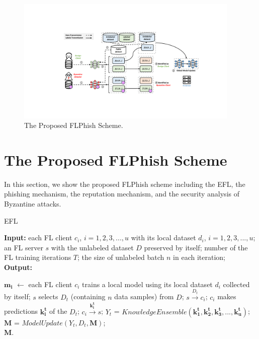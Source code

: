 \documentclass[journal]{IEEEtran}
\begin{document}
\begin{figure}
  \centering
\includegraphics[width=0.95\textwidth]{figures/Figure_FLPhish.pdf}
\caption{The Proposed FLPhish Scheme.}
\label{fig_Phishing}
\end{figure}   


\section{The Proposed FLPhish Scheme}
In this section, we show the proposed FLPhish scheme including the EFL, the phishing mechanism, the reputation mechanism, and the security analysis of Byzantine attacks.

\begin{algorithm}[t]
\caption{EFL} %
\label{alg:system}
\hspace*{0.02in} {\bf Input:} %
each FL client $c_i$, $i=1,2,3,...,u$ with its local dataset $d_i$, $i=1,2,3,...,u$; an FL server $s$ with the unlabeled dataset $D$ preserved by itself; number of the FL training iterations $T$; the size of unlabeled batch $n$ in each iteration;\\
\hspace*{0.02in} {\bf Output:} %
\begin{algorithmic}[1]
  \State $\mathbf{m_i}$ $\gets$ each FL client $c_i$ trains a local model using its local dataset $d_i$ collected by itself;
    \State $s$ selects $D_t$ (containing $n$ data samples) from $D$;
      \State $s \overset{D_{t}}{\rightarrow} c_{i}$;
      \State $c_i$ makes predictions $\mathbf{k_i^t}$ of the $D_t$;
      \State $c_i \overset{\mathbf{k_i^t}}{\rightarrow} s$;
    \EndFor
    \State $Y_t$ = $KnowledgeEnsemble(\mathbf{k_1^t},\mathbf{k_2^t},\mathbf{k_3^t},...,\mathbf{k_u^t})$;
    \State $\mathbf{M}$ = $ModelUpdate(Y_t, D_t, \mathbf{M})$;
  \EndFor \\
  \Return $\mathbf{M}$.
\end{algorithmic}
\end{algorithm}
\end{document}
